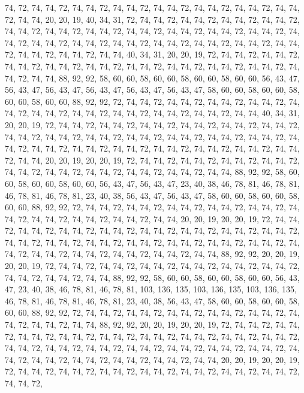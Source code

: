 74, 72, 74, 74, 72, 74, 74, 72, 74, 74, 72, 74, 74, 72, 74, 74, 72, 74, 74, 72, 74, 74, 72, 74, 74, 20, 20, 19, 40, 34, 31, 72, 74, 74, 72, 74, 74, 72, 74, 74, 72, 74, 74, 72, 74, 74, 72, 74, 74, 72, 74, 74, 72, 74, 74, 72, 74, 74, 72, 74, 74, 72, 74, 74,
72, 74, 74, 72, 74, 74, 72, 74, 74, 72, 74, 74, 72, 74, 74, 72, 74, 74, 72, 74, 74, 72, 74, 74, 72, 74, 74, 72, 74, 74, 72, 74, 74, 40, 34, 31, 20, 20, 19, 72, 74, 74, 72, 74, 74, 72, 74, 74, 72, 74, 74, 72, 74, 74, 72, 74, 74, 72, 74, 74, 72, 74, 74, 72,
74, 74, 72, 74, 74, 72, 74, 74, 88, 92, 92, 58, 60, 60, 58, 60, 60, 58, 60, 60, 58, 60, 60, 56, 43, 47, 56, 43, 47, 56, 43, 47, 56, 43, 47, 56, 43, 47, 56, 43, 47, 58, 60, 60, 58, 60, 60, 58, 60, 60, 58, 60, 60, 88, 92, 92, 72, 74, 74, 72, 74, 74, 72, 74,
74, 72, 74, 74, 72, 74, 74, 72, 74, 74, 72, 74, 74, 72, 74, 74, 72, 74, 74, 72, 74, 74, 72, 74, 74, 40, 34, 31, 20, 20, 19, 72, 74, 74, 72, 74, 74, 72, 74, 74, 72, 74, 74, 72, 74, 74, 72, 74, 74, 72, 74, 74, 72, 74, 74, 72, 74, 74, 72, 74, 74, 72, 74, 74,
72, 74, 74, 72, 74, 74, 72, 74, 74, 72, 74, 74, 72, 74, 74, 72, 74, 74, 72, 74, 74, 72, 74, 74, 72, 74, 74, 72, 74, 74, 72, 74, 74, 20, 20, 19, 20, 20, 19, 72, 74, 74, 72, 74, 74, 72, 74, 74, 72, 74, 74, 72, 74, 74, 72, 74, 74, 72, 74, 74, 72, 74, 74, 72,
74, 74, 72, 74, 74, 88, 92, 92, 58, 60, 60, 58, 60, 60, 58, 60, 60, 56, 43, 47, 56, 43, 47, 23, 40, 38, 46, 78, 81, 46, 78, 81, 46, 78, 81, 46, 78, 81, 23, 40, 38, 56, 43, 47, 56, 43, 47, 58, 60, 60, 58, 60, 60, 58, 60, 60, 88, 92, 92, 72, 74, 74, 72, 74,
74, 72, 74, 74, 72, 74, 74, 72, 74, 74, 72, 74, 74, 72, 74, 74, 72, 74, 74, 72, 74, 74, 72, 74, 74, 20, 20, 19, 20, 20, 19, 72, 74, 74, 72, 74, 74, 72, 74, 74, 72, 74, 74, 72, 74, 74, 72, 74, 74, 72, 74, 74, 72, 74, 74, 72, 74, 74, 72, 74, 74, 72, 74, 74,
72, 74, 74, 72, 74, 74, 72, 74, 74, 72, 74, 74, 72, 74, 74, 72, 74, 74, 72, 74, 74, 72, 74, 74, 72, 74, 74, 72, 74, 74, 88, 92, 92, 20, 20, 19, 20, 20, 19, 72, 74, 74, 72, 74, 74, 72, 74, 74, 72, 74, 74, 72, 74, 74, 72, 74, 74, 72, 74, 74, 72, 74, 74, 72,
74, 74, 88, 92, 92, 58, 60, 60, 58, 60, 60, 58, 60, 60, 56, 43, 47, 23, 40, 38, 46, 78, 81, 46, 78, 81, 103, 136, 135, 103, 136, 135, 103, 136, 135, 46, 78, 81, 46, 78, 81, 46, 78, 81, 23, 40, 38, 56, 43, 47, 58, 60, 60, 58, 60, 60, 58, 60, 60, 88, 92, 92, 72, 74,
74, 72, 74, 74, 72, 74, 74, 72, 74, 74, 72, 74, 74, 72, 74, 74, 72, 74, 74, 72, 74, 74, 88, 92, 92, 20, 20, 19, 20, 20, 19, 72, 74, 74, 72, 74, 74, 72, 74, 74, 72, 74, 74, 72, 74, 74, 72, 74, 74, 72, 74, 74, 72, 74, 74, 72, 74, 74, 72, 74, 74, 72, 74, 74,
72, 74, 74, 72, 74, 74, 72, 74, 74, 72, 74, 74, 72, 74, 74, 72, 74, 74, 72, 74, 74, 72, 74, 74, 72, 74, 74, 72, 74, 74, 72, 74, 74, 20, 20, 19, 20, 20, 19, 72, 74, 74, 72, 74, 74, 72, 74, 74, 72, 74, 74, 72, 74, 74, 72, 74, 74, 72, 74, 74, 72, 74, 74, 72,
